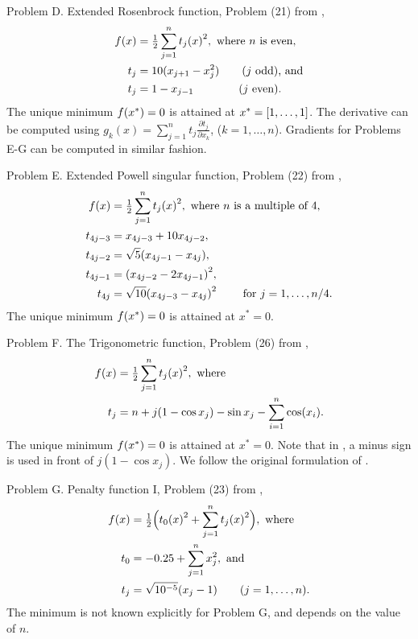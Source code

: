 \documentclass[main.tex]{subfiles}
\begin{document}
Problem D. Extended Rosenbrock function, Problem (21) from
\citet{more1981testing},
\begin{align}
  \begin{split}
    f(x)&={\textstyle\frac{1}{2}}\sum_{j=1}^n {t_j(x)}^2,\text{ where $n$ is even,}\\
    t_j&=10(x_{j+1}-x_j^2)\qquad\text{($j$ odd), and}\\
    t_j&=1-x_{j-1}\qquad\qquad\text{($j$ even).}
  \end{split}
\end{align}
The unique minimum $f(x^*)=0$ is attained at
$x^*=\left[1,\dots,1\right]$.  The derivative can be computed using
$g_k(x)=\sum_{j=1}^n t_j \frac{\partial t_j}{\partial x_k}$,
($k=1,\dots,n$).  Gradients for Problems E-G can be computed in
similar fashion.
\pagebreak[4]

Problem E. Extended Powell singular function, Problem (22) from
\citet{more1981testing},
\begin{align}
  \begin{split}
    f(x)&={\textstyle\frac{1}{2}}\sum_{j=1}^n {t_j(x)}^2,\text{
      where $n$ is a multiple of
      4,}\\
    t_{4j-3} &= x_{4j-3}+10x_{4j-2},\\
    t_{4j-2} &= \sqrt{5}(x_{4j-1}-x_{4j}),\\
    t_{4j-1} &= {(x_{4j-2}-2x_{4j-1})}^2,\\
    t_{4j} &= \sqrt{10}{(x_{4j-3}-x_{4j})}^2 \qquad \text{ for
      $j = 1,\dots,n/4$.}
  \end{split}
\end{align}
The unique minimum $f(x^*)=0$ is attained at $x^*=0$.

Problem F. The Trigonometric function, Problem (26) from
\citet{more1981testing},
\begin{align}
  \begin{split}
    f(x)&={\textstyle\frac{1}{2}}\sum_{j=1}^n {t_j(x)}^2,\text{ where}\\
    t_j &= n + j(1-\cos x_j) - \sin x_j -\sum_{i=1}^n\cos(x_i).
  \end{split}
\end{align}
The unique minimum $f(x^*)=0$ is attained at $x^*=0$.  Note that in
\citet{sterck2013steepest}, a minus sign is used in front of
$j(1-\cos x_j)$. We follow the original formulation of
\citet{more1981testing}.


Problem G. Penalty function I, Problem (23) from
\citet{more1981testing},
\begin{align}
  \begin{split}
    f(x)&={\textstyle\frac{1}{2}}\Bigl( {t_0(x)}^2 +
    \sum_{j=1}^n {t_j(x)}^2\Bigr),\text{ where}\\
    t_0 &= -0.25 + \sum_{j=1}^nx_j^2, \text{ and}\\
    t_j &= \sqrt{10^{-5}}(x_j-1)\qquad (j=1,\dots,n).
  \end{split}
\end{align}
The minimum is not known explicitly for Problem G, and depends on the
value of $n$.
\end{document}
